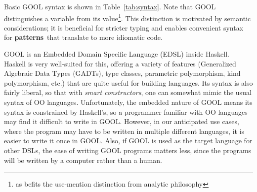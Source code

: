 \documentclass[sigplan,review,prologue,dvipsnames]{acmart}
\newcommand{\abbrev}[1]{\textbf{#1}}
\newcommand{\oopatterns}{\abbrev{patterns}}
\begin{document}
Basic GOOL syntax is shown in Table~\ref{tab:syntax}. Note that GOOL 
distinguishes a 
variable from its value\footnote{as befits the use-mention distinction from 
analytic philosophy}. This distinction is motivated by semantic considerations; 
it is beneficial for stricter typing and enables convenient syntax for 
\oopatterns~that translate to more idiomatic code.

GOOL is an Embedded
Domain Specific Language (EDSL) inside Haskell.  Haskell is very well-suited
for this, offering a variety of features (Generalized Algebraic Data Types 
(GADTs), type classes,
parametric polymorphism, kind polymorphism, etc.) that are quite useful
for building languages.  Its syntax is also fairly liberal, so that
with \emph{smart constructors}, one can somewhat mimic the
usual syntax of OO languages. Unfortunately, the embedded nature of GOOL means 
its syntax is constrained by Haskell's, so a programmer familiar with OO 
languages may find it difficult to write in GOOL. However, in our anticipated 
use cases, where the program may have to be written in multiple different 
languages, it is easier to write it once in GOOL. Also, if GOOL is used as the 
target language for other DSLs, the ease of writing GOOL programs matters less, 
since the programs will be written by a computer rather than a human. 
\end{document}
